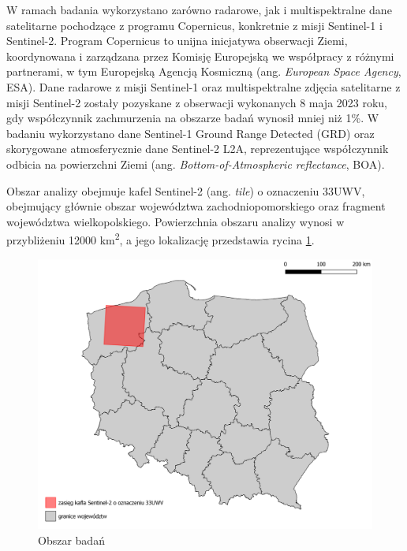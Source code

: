 \documentclass{amuthesis}
\begin{document}
W ramach badania wykorzystano zarówno radarowe, jak i multispektralne
dane satelitarne pochodzące z programu Copernicus, konkretnie z misji
Sentinel-1 i Sentinel-2. Program Copernicus to unijna inicjatywa
obserwacji Ziemi, koordynowana i zarządzana przez Komisję Europejską we
współpracy z różnymi partnerami, w tym Europejską Agencją Kosmiczną
(ang. \emph{European Space Agency}, ESA). Dane radarowe z misji
Sentinel-1 oraz multispektralne zdjęcia satelitarne z misji Sentinel-2
zostały pozyskane z obserwacji wykonanych 8 maja 2023 roku, gdy
współczynnik zachmurzenia na obszarze badań wynosił mniej niż 1\%. W
badaniu wykorzystano dane Sentinel-1 Ground Range Detected (GRD) oraz
skorygowane atmosferycznie dane Sentinel-2 L2A, reprezentujące
współczynnik odbicia na powierzchni Ziemi (ang.
\emph{Bottom-of-Atmospheric reflectance}, BOA).

Obszar analizy obejmuje kafel Sentinel-2 (ang. \emph{tile}) o oznaczeniu
33UWV, obejmujący głównie obszar województwa zachodniopomorskiego oraz
fragment województwa wielkopolskiego. Powierzchnia obszaru analizy
wynosi w przybliżeniu 12000 km\textsuperscript{2}, a jego lokalizację
przedstawia rycina \ref{fig-rycina-area}.

\begin{figure}[t]

{\centering \includegraphics[width=1\textwidth,height=\textheight]{figures/sen2_extent.png}

}

\caption{\label{fig-rycina-area}Obszar badań}

\end{figure}
\end{document}
